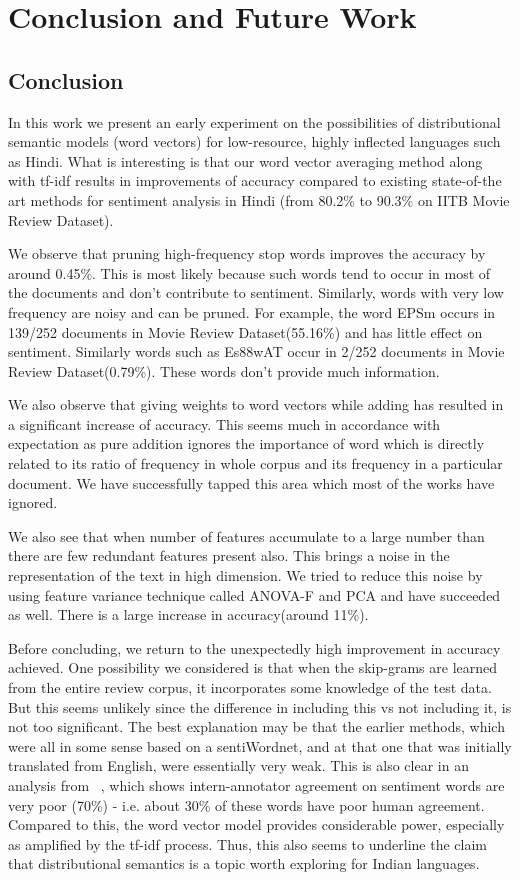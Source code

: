 \chapter{Conclusion and Future Work}
\label{sec:conclusion_future_work}
\section{Conclusion}
\label{sec:conclusion}
In this work we present an early experiment on the possibilities of distributional semantic models (word vectors) for low-resource, highly inflected languages such as Hindi.  What is interesting is that our word vector averaging method along with tf-idf results in improvements of accuracy compared to existing state-of-the art methods for sentiment analysis in Hindi (from 80.2\% to 90.3\% on IITB Movie Review Dataset).

We observe that pruning high-frequency stop words improves the accuracy by around 0.45\%. This is most likely  because such words tend to occur in most of the documents and don't contribute to sentiment.  Similarly, words with very low frequency are noisy and can be pruned. For example, the word {\dn EPSm} occurs in 139/252 documents in Movie Review Dataset(55.16\%) and has little effect on sentiment.
Similarly words such as {\dn Es\388wAT\0} occur in 2/252 documents in Movie Review Dataset(0.79\%). These words don't provide much information.

We also observe that giving weights to word vectors while adding has resulted in a significant increase of accuracy. This seems much in accordance with expectation as pure addition ignores the importance of word which is directly related to its ratio of frequency in whole corpus and its frequency in a particular document. We have successfully tapped this area which most of the works have ignored.

We also see that when number of features accumulate to a large number than there are few redundant features present also. This brings a noise in the representation of the text in high dimension. We tried to reduce this noise by using feature variance technique called ANOVA-F and PCA and have succeeded as well. There is a large increase in accuracy(around 11\%).

Before concluding, we return to the unexpectedly high improvement in accuracy achieved. One possibility we considered is that when the skip-grams are learned from the entire review corpus, it incorporates some knowledge of the test data.  But this seems unlikely since the difference in including this vs not including it, is not too significant.  The best explanation may be that the earlier methods, which were all in some sense based on a sentiWordnet, and at that one that was initially translated from English, were essentially very weak.  This is also clear in an analysis from
~\cite{Bakliwal:12}, which shows intern-annotator agreement on sentiment words are very poor (70\%) - i.e. about 30\% of these words have poor human agreement. Compared to this, the word vector model  
provides considerable power, especially as amplified by the tf-idf process. Thus, this also seems to underline the claim that distributional semantics is a topic worth exploring for Indian languages.

